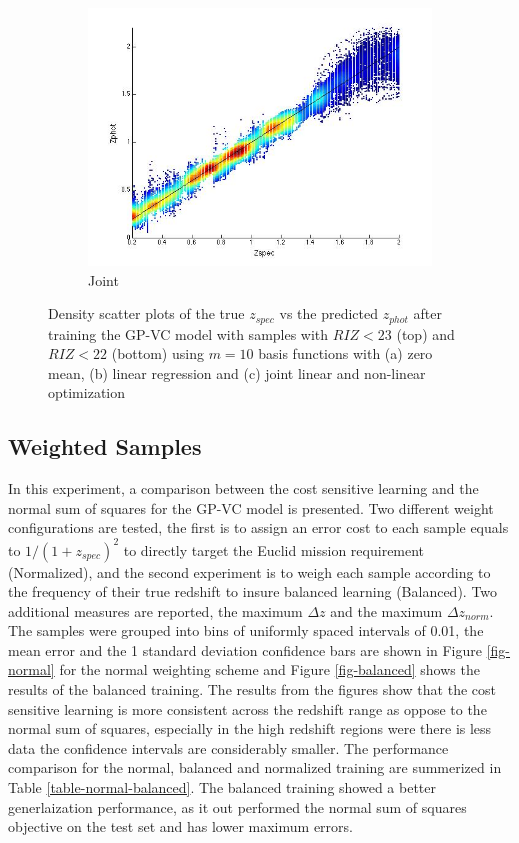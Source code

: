 \documentclass[useAMS,usenatbib,fleqn]{mn2e}
\begin{document}
\begin{figure}
\begin{subfigure}[b]{0.3\columnwidth}
                \includegraphics[trim = 35px 15px 50px 35px, clip=true,width=\textwidth]{figures/22_J.jpg}
                \caption{Joint}
        \end{subfigure}
        
        \caption{Density scatter plots of the true $z_{spec}$ vs the predicted $z_{phot}$ after training the GP-VC model with samples with $RIZ<23$ (top) and $RIZ<22$ (bottom) using $m=10$ basis functions with (a) zero mean, (b) linear regression and (c) joint linear and non-linear optimization}
        \label{fig-RIZ-splits}
\end{figure}


\subsection{Weighted Samples}
In this experiment, a comparison between the cost sensitive learning and the normal sum of squares for the GP-VC model is presented. Two different weight configurations are tested, the first is to assign an error cost to each sample equals to $1/\left(1+z_{spec}\right)^{2}$ to directly target the Euclid mission requirement (Normalized), and the second experiment is to weigh each sample according to the frequency of their true redshift to insure balanced learning (Balanced).  Two additional measures are reported, the maximum $\Delta z$ and the maximum $\Delta z_{norm}$. The samples were grouped into bins of uniformly spaced intervals of 0.01, the mean error and the 1 standard deviation confidence bars are shown in Figure \ref{fig-normal} for the normal weighting scheme and Figure \ref{fig-balanced} shows the results of the balanced training. The results from the figures show that the cost sensitive learning is more consistent across the redshift range as oppose to the normal sum of squares, especially in the high redshift regions were there is less data the confidence intervals are considerably smaller. The performance comparison for the normal, balanced and normalized training are summerized in Table \ref{table-normal-balanced}. The balanced training showed a better generlaization performance, as it out performed the normal sum of squares objective on the test set and has lower maximum errors.
\end{document}
